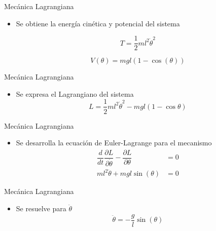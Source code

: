 \documentclass{beamer}
\begin{document}
\begin{frame}{Mecánica Lagrangiana}
\begin{itemize}
 \item Se obtiene la energía cinética y potencial del sistema
 
 \begin{equation}
T = \frac{1}{2}ml^2\dot{\theta}^2
\end{equation}
 
 \begin{equation}
 V(\theta) = m g l ( 1 - \cos (\theta) )
 \label{V_equ}
\end{equation}
\end{itemize}
\end{frame}

\begin{frame}{Mecánica Lagrangiana}
 \begin{itemize}
  \item Se expresa el Lagrangiano del sistema
  \begin{equation}
   L = \dfrac{1}{2}m l^2 \dot{\theta}^2 - m g l (1 - \cos{\theta})
 \label{eq: pendulum lagrangian}
\end{equation}
 \end{itemize}

\end{frame}


\begin{frame}{Mecánica Lagrangiana}
\begin{itemize}
 \item Se desarrolla la ecuación de Euler-Lagrange para el mecanismo
 \begin{equation}
\begin{split}
  \dfrac{d}{dt}\dfrac{\partial L}{\partial \dot{\theta}} - \dfrac{\partial L}{\partial \theta}  &= 0\\
  ml^2\ddot{\theta} + m g l \sin(\theta) & = 0
  \end{split}
 \label{eq: partial derivatives lagrangian}
\end{equation}
\end{itemize}
\end{frame}

\begin{frame}{Mecánica Lagrangiana}
\begin{itemize}
 \item Se resuelve para $\ddot{\theta}$
 \begin{equation}
 \ddot{\theta} = - \dfrac{g}{l} \sin (\theta)
 \label{eq: angular acceleration lagrange}
\end{equation}
\end{itemize}
\end{frame}
\end{document}
